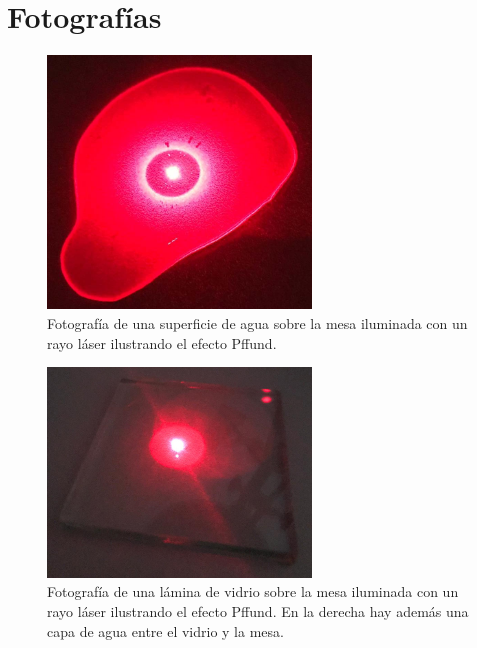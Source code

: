 \documentclass[12pt]{article}
\numberwithin{table}{section}
\numberwithin{figure}{section}
\numberwithin{equation}{section}
\begin{document}
\section{Fotografías}

\begin{figure}[!ht]
	\small \centering \sffamily
	\begin{center}
		\includegraphics[width=7cm]{P2PffAgua.jpeg}
		\caption{Fotografía de una superficie de agua sobre la mesa iluminada con un rayo láser ilustrando el efecto Pffund.}
		\label{P2PffFotoAgua}
	\end{center}
\end{figure}

\begin{figure}[!ht]
	\small \centering \sffamily
	\begin{center}
		\includegraphics[width=7cm]{P2PffVidrio.jpeg}
		\caption{Fotografía de una lámina de vidrio sobre la mesa iluminada con un rayo láser ilustrando el efecto Pffund. En la derecha hay además una capa de agua entre el vidrio y la mesa.}
		\label{P2PffFotoVidrio}
	\end{center}
\end{figure}
\end{document}
